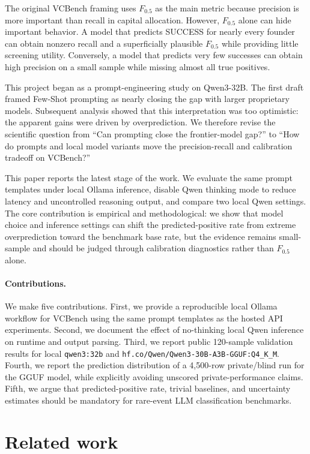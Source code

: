 \documentclass{article}
\begin{document}
The original VCBench framing uses $F_{0.5}$ as the main metric because
precision is more important than recall in capital allocation. However,
$F_{0.5}$ alone can hide important behavior. A model that predicts SUCCESS for
nearly every founder can obtain nonzero recall and a superficially plausible
$F_{0.5}$ while providing little screening utility. Conversely, a model that
predicts very few successes can obtain high precision on a small sample while
missing almost all true positives.

This project began as a prompt-engineering study on Qwen3-32B. The first draft
framed Few-Shot prompting as nearly closing the gap with larger proprietary
models. Subsequent analysis showed that this interpretation was too optimistic:
the apparent gains were driven by overprediction. We therefore revise the
scientific question from ``Can prompting close the frontier-model gap?'' to
``How do prompts and local model variants move the precision-recall and
calibration tradeoff on VCBench?''

This paper reports the latest stage of the work. We evaluate the same prompt
templates under local Ollama inference, disable Qwen thinking mode to reduce
latency and uncontrolled reasoning output, and compare two local Qwen settings.
The core contribution is empirical and methodological: we show that model choice
and inference settings can shift the predicted-positive rate from extreme
overprediction toward the benchmark base rate, but the evidence remains
small-sample and should be judged through calibration diagnostics rather than
$F_{0.5}$ alone.

\paragraph{Contributions.}
We make five contributions. First, we provide a reproducible local Ollama
workflow for VCBench using the same prompt templates as the hosted API
experiments. Second, we document the effect of no-thinking local Qwen inference
on runtime and output parsing. Third, we report public 120-sample validation
results for local \texttt{qwen3:32b} and
\texttt{hf.co/Qwen/Qwen3-30B-A3B-GGUF:Q4\_K\_M}. Fourth, we report the
prediction distribution of a 4,500-row private/blind run for the GGUF model,
while explicitly avoiding unscored private-performance claims. Fifth, we argue
that predicted-positive rate, trivial baselines, and uncertainty estimates
should be mandatory for rare-event LLM classification benchmarks.

\section{Related work}
\end{document}
